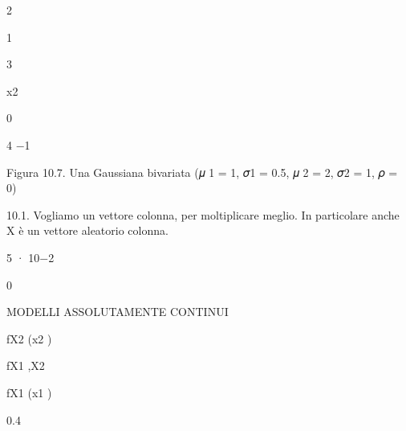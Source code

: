 \documentclass[a4paper,portrait,12pt]{article}
\begin{document}
2





1


3





\begin{flushleft}
x2
\end{flushleft}





0


4 $-$1





\begin{flushleft}
Figura 10.7. Una Gaussiana bivariata (𝜇 1 = 1, 𝜎1 = 0.5, 𝜇 2 = 2, 𝜎2 = 1, 𝜌 = 0)
\end{flushleft}


\begin{flushleft}
10.1. Vogliamo un vettore colonna, per moltiplicare meglio. In particolare anche X \`{e} un vettore aleatorio colonna.
\end{flushleft}





5 · 10$-$2


0










\begin{flushleft}
MODELLI ASSOLUTAMENTE CONTINUI
\end{flushleft}





\begin{flushleft}
fX2 (x2 )
\end{flushleft}





\begin{flushleft}
fX1 ,X2
\end{flushleft}





\begin{flushleft}
fX1 (x1 )
\end{flushleft}


0.4
\end{document}

